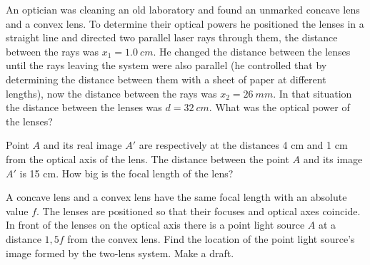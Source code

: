 \documentclass[11pt]{article}
\begin{document}

\probeng
An optician was cleaning an old laboratory and found an unmarked concave lens and a convex lens. To determine their optical powers he positioned the lenses in a straight line and directed two parallel laser rays through them, the distance between the rays was $x_{1}=\SI{1,0}{cm}$. He changed the distance between the lenses until the rays leaving the system were also parallel (he controlled that by determining the distance between them with a sheet of paper at different lengths), now the distance between the rays was $x_{2}=\SI{26}{mm}$. In that situation the distance between the lenses was $d=\SI{32}{cm}$. What was the optical power of the lenses?
\probend
\bigskip


\probeng
Point $A$ and its real image $A'$ are respectively at the distances 4 cm and 1 cm from the optical axis of the lens. The distance between the point $A$ and its image $A'$ is 15 cm. How big is the focal length of the lens?
\probend
\bigskip


\probeng
A concave lens and a convex lens have the same focal length with an absolute value $f$. The lenses are positioned so that their focuses and optical axes coincide. In front of the lenses on the optical axis there is a point light source $A$ at a distance $1,5f$ from the convex lens. Find the location of the point light source's image formed by the two-lens system. Make a draft.
\probend
\bigskip

\end{document}
